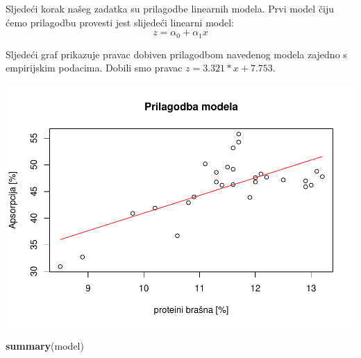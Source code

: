 \documentclass[]{article}
\newenvironment{Shaded}{\begin{snugshade}}{\end{snugshade}}
\newcommand{\KeywordTok}[1]{\textcolor[rgb]{0.13,0.29,0.53}{\textbf{{#1}}}}
\newcommand{\DataTypeTok}[1]{\textcolor[rgb]{0.13,0.29,0.53}{{#1}}}
\newcommand{\StringTok}[1]{\textcolor[rgb]{0.31,0.60,0.02}{{#1}}}
\newcommand{\NormalTok}[1]{{#1}}
\begin{document}
Sljedeći korak našeg zadatka su prilagodbe linearnih modela. Prvi model
čiju ćemo prilagodbu provesti jest slijedeći linearni model:
\[z = \alpha_0 + \alpha_1 x \]

\begin{Shaded}
\end{Shaded}

Sljedeći graf prikazuje pravac dobiven prilagodbom navedenog modela
zajedno s empirijskim podacima. Dobili smo pravac
\(z = 3.321*x + 7.753\).

\begin{Shaded}
\end{Shaded}

\includegraphics{Izvjestaj_files/figure-latex/unnamed-chunk-28-1.pdf}

\begin{Shaded}
\begin{Highlighting}[]
\KeywordTok{summary}\NormalTok{(model)}
\end{Highlighting}
\end{Shaded}
\end{document}
